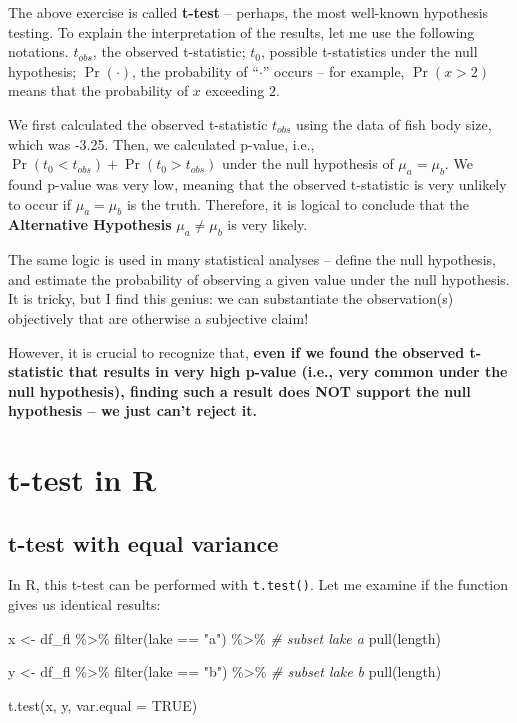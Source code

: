 \documentclass[
]{book}
\newenvironment{Shaded}{\begin{snugshade}}{\end{snugshade}}
\newcommand{\AttributeTok}[1]{\textcolor[rgb]{0.77,0.63,0.00}{#1}}
\newcommand{\CommentTok}[1]{\textcolor[rgb]{0.56,0.35,0.01}{\textit{#1}}}
\newcommand{\ConstantTok}[1]{\textcolor[rgb]{0.00,0.00,0.00}{#1}}
\newcommand{\FunctionTok}[1]{\textcolor[rgb]{0.00,0.00,0.00}{#1}}
\newcommand{\NormalTok}[1]{#1}
\newcommand{\OtherTok}[1]{\textcolor[rgb]{0.56,0.35,0.01}{#1}}
\newcommand{\SpecialCharTok}[1]{\textcolor[rgb]{0.00,0.00,0.00}{#1}}
\newcommand{\StringTok}[1]{\textcolor[rgb]{0.31,0.60,0.02}{#1}}
\begin{document}
The above exercise is called \textbf{t-test} -- perhaps, the most well-known hypothesis testing. To explain the interpretation of the results, let me use the following notations. \(t_{obs}\), the observed t-statistic; \(t_0\), possible t-statistics under the null hypothesis; \(\Pr(\cdot)\), the probability of ``\(\cdot\)'' occurs -- for example, \(\Pr(x > 2)\) means that the probability of \(x\) exceeding \(2\).

We first calculated the observed t-statistic \(t_{obs}\) using the data of fish body size, which was -3.25. Then, we calculated p-value, i.e., \(\Pr(t_0 < t_{obs}) + \Pr(t_0 > t_{obs})\) under the null hypothesis of \(\mu_a = \mu_b\). We found p-value was very low, meaning that the observed t-statistic is very unlikely to occur if \(\mu_a = \mu_b\) is the truth. Therefore, it is logical to conclude that the \textbf{Alternative Hypothesis} \(\mu_a \ne \mu_b\) is very likely.

The same logic is used in many statistical analyses -- define the null hypothesis, and estimate the probability of observing a given value under the null hypothesis. It is tricky, but I find this genius: we can substantiate the observation(s) objectively that are otherwise a subjective claim!

However, it is crucial to recognize that, \textbf{even if we found the observed t-statistic that results in very high p-value (i.e., very common under the null hypothesis), finding such a result does NOT support the null hypothesis -- we just can't reject it.}

\hypertarget{t-test-in-r}{%
\section{t-test in R}\label{t-test-in-r}}

\hypertarget{t-test-with-equal-variance}{%
\subsection{t-test with equal variance}\label{t-test-with-equal-variance}}

In R, this t-test can be performed with \texttt{t.test()}. Let me examine if the function gives us identical results:

\begin{Shaded}
\begin{Highlighting}[]
\NormalTok{x }\OtherTok{\textless{}{-}}\NormalTok{ df\_fl }\SpecialCharTok{\%\textgreater{}\%}
  \FunctionTok{filter}\NormalTok{(lake }\SpecialCharTok{==} \StringTok{"a"}\NormalTok{) }\SpecialCharTok{\%\textgreater{}\%}  \CommentTok{\# subset lake a}
  \FunctionTok{pull}\NormalTok{(length)}

\NormalTok{y }\OtherTok{\textless{}{-}}\NormalTok{ df\_fl }\SpecialCharTok{\%\textgreater{}\%}
  \FunctionTok{filter}\NormalTok{(lake }\SpecialCharTok{==} \StringTok{"b"}\NormalTok{) }\SpecialCharTok{\%\textgreater{}\%} \CommentTok{\# subset lake b}
  \FunctionTok{pull}\NormalTok{(length)}

\FunctionTok{t.test}\NormalTok{(x, y, }\AttributeTok{var.equal =} \ConstantTok{TRUE}\NormalTok{)}
\end{Highlighting}
\end{Shaded}
\end{document}
